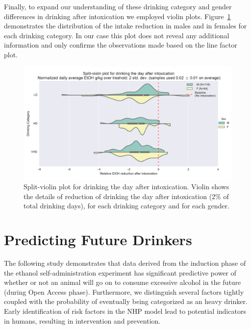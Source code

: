 	Finally, to expand our understanding of these drinking category and gender differences in drinking after intoxication we employed violin plots. Figure~\ref{fig:intox-violin} demonstrates the distribution of the intake reduction in males and in females for each drinking category. In our case this plot does not reveal any additional information and only confirms the observations made based on the line factor plot.  	
	\begin{figure}[ht]
		\centering
		\includegraphics[width=\linewidth]{figures/intox_split-violin_mf.pdf}
		\caption{Split-violin plot for drinking the day after intoxication. Violin shows the details of reduction of drinking the day after intoxication (2\% of total drinking days), for each drinking category and for each gender.}
		\label{fig:intox-violin}	
	\end{figure}
	
	 
	
\pagebreak	
\section{Predicting Future Drinkers \label{section:predicting-drinkers}}
	The following study demonstrates that data derived from the induction phase of the ethanol self-administration experiment has significant predictive power of whether or not an animal will go on to consume excessive alcohol in the future (during Open Access phase). Furthermore, we distinguish several factors tightly coupled with the probability of eventually being categorized as an heavy drinker. Early identification of risk factors in the NHP model lead to potential indicators in humans, resulting	in intervention and prevention.
	

